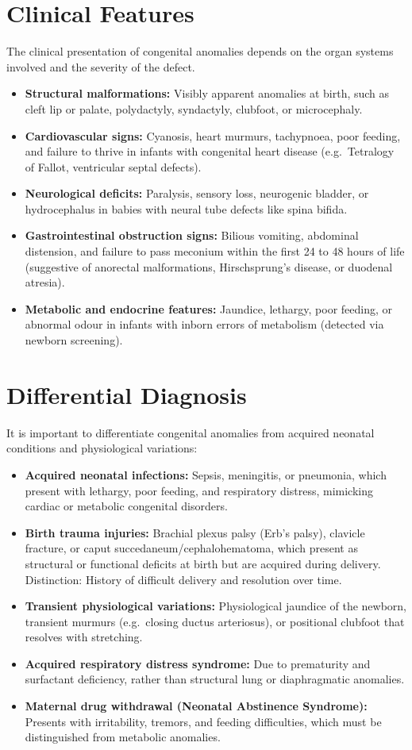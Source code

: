 \section*{Clinical Features}
The clinical presentation of congenital anomalies depends on the organ systems involved and the severity of the defect.
\begin{itemize}
    \item \textbf{Structural malformations:} Visibly apparent anomalies at birth, such as cleft lip or palate, polydactyly, syndactyly, clubfoot, or microcephaly.
    \item \textbf{Cardiovascular signs:} Cyanosis, heart murmurs, tachypnoea, poor feeding, and failure to thrive in infants with congenital heart disease (e.g.\ Tetralogy of Fallot, ventricular septal defects).
    \item \textbf{Neurological deficits:} Paralysis, sensory loss, neurogenic bladder, or hydrocephalus in babies with neural tube defects like spina bifida.
    \item \textbf{Gastrointestinal obstruction signs:} Bilious vomiting, abdominal distension, and failure to pass meconium within the first 24 to 48 hours of life (suggestive of anorectal malformations, Hirschsprung's disease, or duodenal atresia).
    \item \textbf{Metabolic and endocrine features:} Jaundice, lethargy, poor feeding, or abnormal odour in infants with inborn errors of metabolism (detected via newborn screening).
\end{itemize}

\section*{Differential Diagnosis}
It is important to differentiate congenital anomalies from acquired neonatal conditions and physiological variations:
\begin{itemize}
    \item \textbf{Acquired neonatal infections:} Sepsis, meningitis, or pneumonia, which present with lethargy, poor feeding, and respiratory distress, mimicking cardiac or metabolic congenital disorders.
    \item \textbf{Birth trauma injuries:} Brachial plexus palsy (Erb's palsy), clavicle fracture, or caput succedaneum/cephalohematoma, which present as structural or functional deficits at birth but are acquired during delivery. Distinction: History of difficult delivery and resolution over time.
    \item \textbf{Transient physiological variations:} Physiological jaundice of the newborn, transient murmurs (e.g.\ closing ductus arteriosus), or positional clubfoot that resolves with stretching.
    \item \textbf{Acquired respiratory distress syndrome:} Due to prematurity and surfactant deficiency, rather than structural lung or diaphragmatic anomalies.
    \item \textbf{Maternal drug withdrawal (Neonatal Abstinence Syndrome):} Presents with irritability, tremors, and feeding difficulties, which must be distinguished from metabolic anomalies.
\end{itemize}


